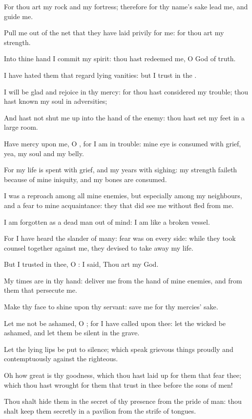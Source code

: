 \Verse For thou art my rock and my fortress; therefore for thy name's sake lead me, and guide me.

\Verse Pull me out of the net that they have laid privily for me: for thou art my strength.

\Verse Into thine hand I commit my spirit: thou hast redeemed me, O \LORD God of truth.

\Verse I have hated them that regard lying vanities: but I trust in the \LORD.

\Verse I will be glad and rejoice in thy mercy: for thou hast considered my trouble; thou hast known my soul in adversities;

\Verse And hast not shut me up into the hand of the enemy: thou hast set my feet in a large room.

\Verse Have mercy upon me, O \LORD, for I am in trouble: mine eye is consumed with grief, yea, my soul and my belly.

\Verse For my life is spent with grief, and my years with sighing: my strength faileth because of mine iniquity, and my bones are consumed.

\Verse I was a reproach among all mine enemies, but especially among my neighbours, and a fear to mine acquaintance: they that did see me without fled from me.

\Verse I am forgotten as a dead man out of mind: I am like a broken vessel.

\Verse For I have heard the slander of many: fear was on every side: while they took counsel together against me, they devised to take away my life.

\Verse But I trusted in thee, O \LORD: I said, Thou art my God.

\Verse My times are in thy hand: deliver me from the hand of mine enemies, and from them that persecute me.

\Verse Make thy face to shine upon thy servant: save me for thy mercies' sake.

\Verse Let me not be ashamed, O \LORD; for I have called upon thee: let the wicked be ashamed, and let them be silent in the grave.

\Verse Let the lying lips be put to silence; which speak grievous things proudly and contemptuously against the righteous.

\Verse Oh how great is thy goodness, which thou hast laid up for them that fear thee; which thou hast wrought for them that trust in thee before the sons of men!

\Verse Thou shalt hide them in the secret of thy presence from the pride of man: thou shalt keep them secretly in a pavilion from the strife of tongues.

